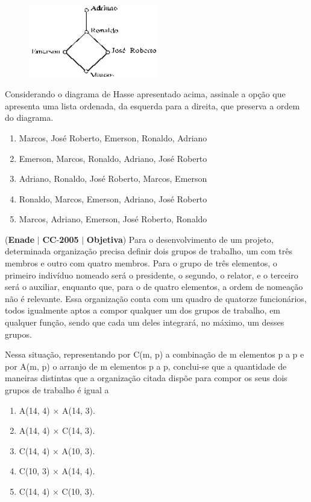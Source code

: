 \documentclass{exam}
\begin{document}
\begin{questions}
\begin{figure}[H]
	\begin{center}
		\includegraphics[width=0.5\textwidth]{CIENCIA_DA_COMPUTACAO_Prova2005-utf8_figuras/fig-0017.jpg}
	\end{center}
\end{figure}
Considerando o diagrama de Hasse apresentado acima,
assinale a opção que apresenta uma lista ordenada, da
esquerda para a direita, que preserva a ordem do diagrama.
	\begin{enumerate}[label=\alph*)]
		\item  Marcos, José Roberto, Emerson, Ronaldo, Adriano
		\item  Emerson, Marcos, Ronaldo, Adriano, José Roberto
		\item  Adriano, Ronaldo, José Roberto, Marcos, Emerson
		\item  Ronaldo, Marcos, Emerson, Adriano, José Roberto
		\item  Marcos, Adriano, Emerson, José Roberto, Ronaldo
	\end{enumerate}

\question (\textbf{Enade} $|$ \textbf{CC}-\textbf{2005} $|$ \textbf{Objetiva})
Para o desenvolvimento de um projeto,
determinada organização precisa definir dois grupos de
trabalho, um com três membros e outro com quatro
membros. Para o grupo de três elementos, o primeiro
indivíduo nomeado será o presidente, o segundo, o
relator, e o terceiro será o auxiliar, enquanto que, para
o de quatro elementos, a ordem de nomeação não é
relevante. Essa organização conta com um quadro de
quatorze funcionários, todos igualmente aptos a compor
qualquer um dos grupos de trabalho, em qualquer
função, sendo que cada um deles integrará, no máximo,
um desses grupos.

Nessa situação, representando por C(m, p) a combinação de
m elementos p a p e por A(m, p) o arranjo de m elementos
p a p, conclui-se que a quantidade de maneiras distintas que a
organização citada dispõe para compor os seus dois grupos de
trabalho é igual a
	\begin{enumerate}[label=\alph*)]
		\item  A(14, 4) × A(14, 3).
		\item  A(14, 4) × C(14, 3).
		\item  C(14, 4) × A(10, 3).
		\item  C(10, 3) × A(14, 4).
		\item  C(14, 4) × C(10, 3).
	\end{enumerate}


\end{questions}
\end{document}
